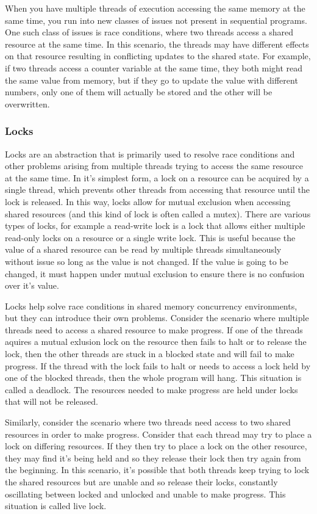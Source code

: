 \documentclass{article}
\begin{document}
When you have multiple threads of execution accessing the same memory at the
same time, you run into new classes of issues not present in sequential
programs. One such class of issues is race conditions, where two threads access
a shared resource at the same time. In this scenario, the threads may have
different effects on that resource resulting in conflicting updates to the
shared state. For example, if two threads access a counter variable at the same
time, they both might read the same value from memory, but if they go to update
the value with different numbers, only one of them will actually be stored and
the other will be overwritten.

\subsubsection{Locks}
Locks are an abstraction that is primarily used to resolve race conditions and
other problems arising from multiple threads trying to access the same resource
at the same time. In it's simplest form, a lock on a resource can be acquired by
a single thread, which prevents other threads from accessing that resource until
the lock is released. In this way, locks allow for mutual exclusion when accessing
shared resources (and this kind of lock is often called a mutex). There are various
types of locks, for example a read-write lock is a lock that allows either multiple
read-only locks on a resource or a single write lock. This is useful because the
value of a shared resource can be read by multiple threads simultaneously without
issue so long as the value is not changed. If the value is going to be changed, it
must happen under mutual exclusion to ensure there is no confusion over it's value.

Locks help solve race conditions in shared memory concurrency environments, but
they can introduce their own problems. Consider the scenario where multiple
threads need to access a shared resource to make progress. If one of the threads
aquires a mutual exlusion lock on the resource then fails to halt or to release
the lock, then the other threads are stuck in a blocked state and will fail to
make progress. If the thread with the lock fails to halt or needs to access a
lock held by one of the blocked threads, then the whole program will hang. This
situation is called a deadlock. The resources needed to make progress are held
under locks that will not be released.

Similarly, consider the scenario where two threads need access to two shared
resources in order to make progress. Consider that each thread may try to place
a lock on differing resources. If they then try to place a lock on the other
resource, they may find it's being held and so they release their lock then
try again from the beginning. In this scenario, it's possible that both threads
keep trying to lock the shared resources but are unable and so release their locks,
constantly oscillating between locked and unlocked and unable to make progress.
This situation is called live lock.
\end{document}
